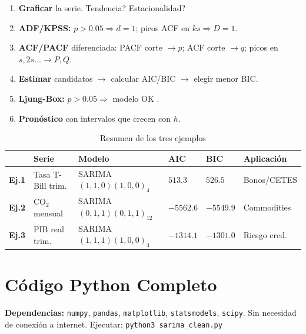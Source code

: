 \documentclass[11pt, a4paper]{article}
\begin{document}
\begin{tcolorbox}[formula, title={Checklist Box-Jenkins}]
\begin{enumerate}[noitemsep]
  \item \textbf{Graficar} la serie. \textquestiondown Tendencia? \textquestiondown Estacionalidad?
  \item \textbf{ADF/KPSS:} $p>0.05 \Rightarrow d=1$; picos ACF en $ks \Rightarrow D=1$.
  \item \textbf{ACF/PACF} diferenciada: PACF corte $\to p$; ACF corte $\to q$; picos en $s,2s\ldots \to P,Q$.
  \item \textbf{Estimar} candidatos $\to$ calcular AIC/BIC $\to$ elegir menor BIC.
  \item \textbf{Ljung-Box:} $p>0.05 \Rightarrow$ modelo OK \checkmark.
  \item \textbf{Pron\'ostico} con intervalos que crecen con $h$.
\end{enumerate}
\end{tcolorbox}

\begin{table}[H]\centering
\caption{Resumen de los tres ejemplos}
\renewcommand{\arraystretch}{1.35}
\begin{tabular}{llllll}
\toprule
\rowcolor{navy!12}
\color{navy} & \color{navy}Serie & \color{navy}Modelo &
\color{navy}AIC & \color{navy}BIC & \color{navy}Aplicaci\'on\\
\midrule
\textbf{Ej.1} & Tasa T-Bill trim.   & SARIMA$(1,1,0)(1,0,0)_4$    & $513.3$   & $526.5$   & Bonos/CETES\\
\textbf{Ej.2} & CO$_2$ mensual      & SARIMA$(0,1,1)(0,1,1)_{12}$ & $-5562.6$ & $-5549.9$ & Commodities\\
\textbf{Ej.3} & PIB real trim.      & SARIMA$(1,1,1)(1,0,0)_4$    & $-1314.1$ & $-1301.0$ & Riesgo cred.\\
\bottomrule
\end{tabular}
\end{table}

\newpage

\section{C\'odigo Python Completo}

\begin{tcolorbox}[nota]
\textbf{Dependencias:} \texttt{numpy}, \texttt{pandas}, \texttt{matplotlib},
\texttt{statsmodels}, \texttt{scipy}. Sin necesidad de conexi\'on a internet.
Ejecutar: \texttt{python3 sarima\_clean.py}
\end{tcolorbox}
\end{document}
